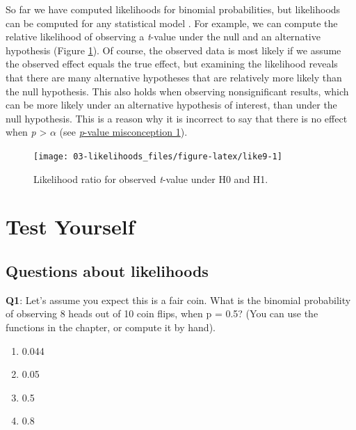 \documentclass[
  oneside]{krantz}
\providecommand{\tightlist}{%
  \setlength{\itemsep}{0pt}\setlength{\parskip}{0pt}}
\begin{document}
So far we have computed likelihoods for binomial probabilities, but likelihoods can be computed for any statistical model \citep{glover_likelihood_2004, pawitan_all_2001}. For example, we can compute the relative likelihood of observing a \emph{t}-value under the null and an alternative hypothesis (Figure \ref{fig:like9}). Of course, the observed data is most likely if we assume the observed effect equals the true effect, but examining the likelihood reveals that there are many alternative hypotheses that are relatively more likely than the null hypothesis. This also holds when observing nonsignificant results, which can be more likely under an alternative hypothesis of interest, than under the null hypothesis. This is a reason why it is incorrect to say that there is no effect when \emph{p} \textgreater{} \(\alpha\) (see \protect\hyperlink{misconception1}{\emph{p}-value misconception 1}).



\begin{figure}

{\centering \texttt{[image: 03-likelihoods\_files/figure-latex/like9-1]} 

}

\caption{Likelihood ratio for observed \emph{t}-value under H0 and H1.}\label{fig:like9}
\end{figure}

\hypertarget{test-yourself-2}{%
\section{Test Yourself}\label{test-yourself-2}}

\hypertarget{questions-about-likelihoods}{%
\subsection{Questions about likelihoods}\label{questions-about-likelihoods}}

\textbf{Q1}: Let's assume you expect this is a fair coin. What is the binomial probability of observing 8 heads out of 10 coin flips, when p = 0.5? (You can use the functions in the chapter, or compute it by hand).

\begin{enumerate}
\def\labelenumi{\Alph{enumi})}
\tightlist
\item
  0.044
\item
  0.05
\item
  0.5
\item
  0.8
\end{enumerate}
\end{document}

